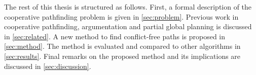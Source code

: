 
The rest of this thesis is structured as follows. First, a formal description
of the cooperative pathfinding problem is given in \autoref{sec:problem}.
Previous work in cooperative pathfinding, argumentation and partial global
planning is discussed in \autoref{sec:related}. A new method to find
conflict-free paths is proposed in \autoref{sec:method}. The method is
evaluated and compared to other algorithms in \autoref{sec:results}. Final
remarks on the proposed method and its implications are discussed in
\autoref{sec:discussion}.
